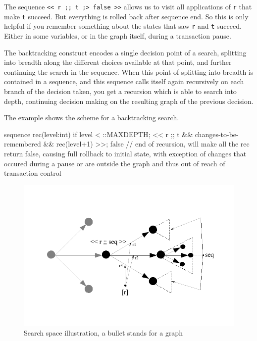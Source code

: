 \begin{example}
The sequence \verb#<< r ;; t ;> false >># allows us to visit all applications of \texttt{r} that make \texttt{t} succeed.
But everything is rolled back after sequence end.
So this is only helpful if you remember something about the states that saw \texttt{r} and \texttt{t} succeed.
Either in some variables, or in the graph itself, during a transaction pause. 
\end{example}

The backtracking construct encodes a single decision point of a search, splitting into breadth along the different choices available at that point, and further continuing the search in the sequence.
When this point of splitting into breadth is contained in a sequence,
and this sequence calls itself again recursively on each branch of the decision taken,
you get a recursion which is able to search into depth,
continuing decision making on the resulting graph of the previous decision. 

\begin{example}
The example shows the scheme for a backtracking search.
\begin{grgen}
sequence rec(level:int) {
	if{ {{level < ::MAXDEPTH}};
		<< r ;; t && changes-to-be-remembered && rec(level+1) >>;
		false } // end of recursion, will make all the rec return false, causing full rollback to initial state, with exception of changes that occured during a pause or are outside the graph and thus out of reach of transaction control
}
\end{grgen}
\end{example}

\begin{figure}[htbp]
  \centering
  \includegraphics[width=\textwidth]{fig/SearchSpace}
  \caption{Search space illustration, a bullet stands for a graph}
  \label{figsearchspace}
\end{figure}

